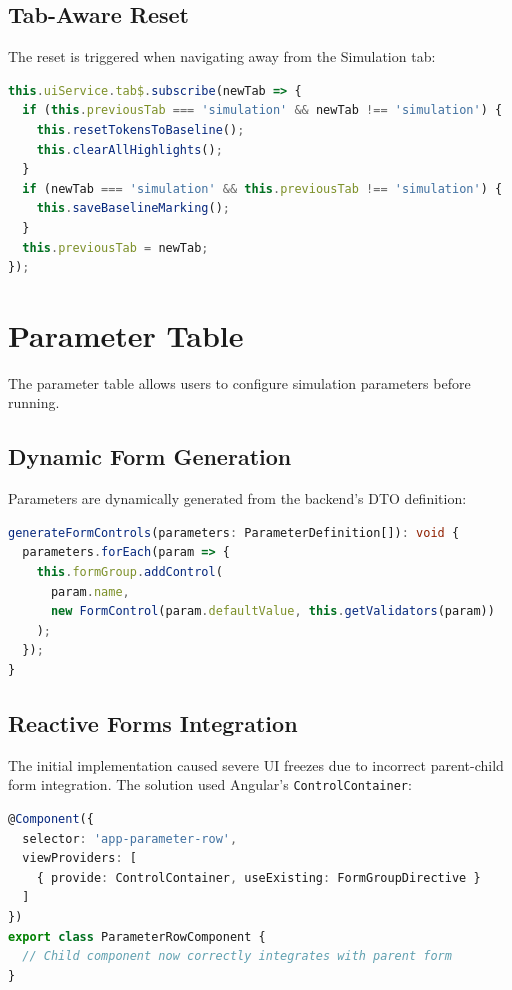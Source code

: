 \subsection{Tab-Aware Reset}

The reset is triggered when navigating away from the Simulation tab:

\begin{lstlisting}[language=TypeScript, caption={Tab-aware token reset}]
this.uiService.tab$.subscribe(newTab => {
  if (this.previousTab === 'simulation' && newTab !== 'simulation') {
    this.resetTokensToBaseline();
    this.clearAllHighlights();
  }
  if (newTab === 'simulation' && this.previousTab !== 'simulation') {
    this.saveBaselineMarking();
  }
  this.previousTab = newTab;
});
\end{lstlisting}

\section{Parameter Table}
\label{sec:parameter-table}

The parameter table allows users to configure simulation parameters before running.

\subsection{Dynamic Form Generation}

Parameters are dynamically generated from the backend's DTO definition:

\begin{lstlisting}[language=TypeScript, caption={Dynamic parameter form generation}]
generateFormControls(parameters: ParameterDefinition[]): void {
  parameters.forEach(param => {
    this.formGroup.addControl(
      param.name,
      new FormControl(param.defaultValue, this.getValidators(param))
    );
  });
}
\end{lstlisting}

\subsection{Reactive Forms Integration}

The initial implementation caused severe UI freezes due to incorrect parent-child form integration. The solution used Angular's \texttt{ControlContainer}:

\begin{lstlisting}[language=TypeScript, caption={ControlContainer fix for nested forms}]
@Component({
  selector: 'app-parameter-row',
  viewProviders: [
    { provide: ControlContainer, useExisting: FormGroupDirective }
  ]
})
export class ParameterRowComponent {
  // Child component now correctly integrates with parent form
}
\end{lstlisting}

